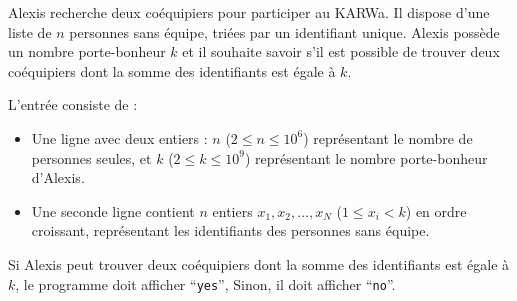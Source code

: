 \problemname{\problemyamlname}


\newcommand{\maxa}{123456789}

Alexis recherche deux coéquipiers pour participer au KARWa. Il dispose d'une liste de $n$ personnes sans équipe, triées par un identifiant unique.
Alexis possède un nombre porte-bonheur $k$ et il souhaite savoir s'il est possible de trouver deux coéquipiers dont la somme des identifiants est égale à $k$.

\begin{Input}
	L'entrée consiste de :
	\begin{itemize}
		\item Une ligne avec deux entiers : $n$ ($2 \le n \le 10^6$) représentant le nombre de personnes seules, et $k$ ($2 \le k \le 10^9$) représentant le nombre porte-bonheur d'Alexis.
		\item Une seconde ligne contient $n$ entiers $x_1, x_2, \dots, x_N$ ($1 \le x_i < k$) en ordre croissant, représentant les identifiants des personnes sans équipe.
	\end{itemize}
\end{Input}

\begin{Output}
	Si Alexis peut trouver deux coéquipiers dont la somme des identifiants est égale à $k$, le programme doit afficher ``\verb|yes|'', Sinon, il doit afficher ``\verb|no|''.
\end{Output}
